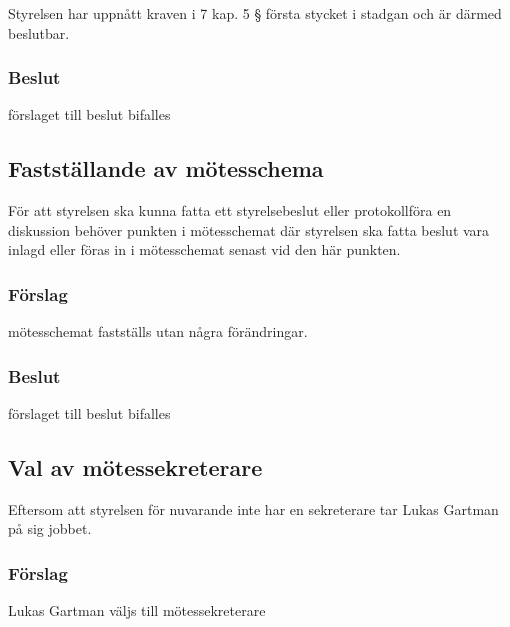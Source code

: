\documentclass[protokoll]{dvd}
\begin{document}
\begin{attsatser}
    \item Styrelsen har uppnått kraven i 7 kap. 5 § första stycket i stadgan och är därmed beslutbar.
\end{attsatser}
\subsubsection*{Beslut}
\begin{attsatser}
    \item förslaget till beslut bifalles
\end{attsatser}


\subsection{Fastställande av mötesschema}

För att styrelsen ska kunna fatta ett styrelsebeslut eller protokollföra en diskussion behöver punkten i mötesschemat där styrelsen ska fatta beslut vara inlagd eller föras in i mötesschemat senast vid den här punkten.

\subsubsection*{Förslag}

\begin{attsatser}
    \item mötesschemat fastställs utan några förändringar.
\end{attsatser}
\subsubsection*{Beslut}
\begin{attsatser}
    \item förslaget till beslut bifalles
\end{attsatser}

\subsection{Val av mötessekreterare}
Eftersom att styrelsen för nuvarande inte har en sekreterare tar Lukas Gartman på sig jobbet.
\subsubsection*{Förslag}
\begin{attsatser}
    \item Lukas Gartman väljs till mötessekreterare
\end{attsatser}
\end{document}
